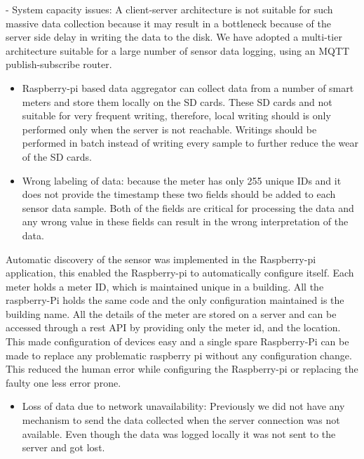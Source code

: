 - System capacity issues: A client-server architecture is not suitable for such massive data collection because it may result in a bottleneck because of the server side delay in writing the data to the disk. We have adopted a multi-tier architecture suitable for a large number of sensor data logging, using an MQTT publish-subscribe router.

\begin{itemize}
 \item Raspberry-pi based data aggregator can collect data from a number of smart meters and store them locally on the SD cards. These SD cards and not suitable for very frequent writing, therefore, local writing should is only performed only when the server is not reachable. Writings should be performed in batch instead of writing every sample to further reduce the wear of the SD cards.
\end{itemize}

\begin{itemize}
 \item Wrong labeling of data: because the meter has only 255 unique IDs and it does not provide the timestamp these two fields should be added to each sensor data sample. Both of the fields are critical for processing the data and any wrong value in these fields can result in the wrong interpretation of the data.
\end{itemize}

Automatic discovery of the sensor was implemented in the Raspberry-pi application, this enabled the Raspberry-pi to automatically configure itself. Each meter holds a meter ID, which is maintained unique in a building.  All the raspberry-Pi holds the same code and the only configuration maintained is the building name. All the details of the meter are stored on a server and can be accessed through a rest API by providing only the meter id, and the location. This made configuration of devices easy and a single spare Raspberry-Pi can be made to replace any problematic raspberry pi without any configuration change. This reduced the human error while configuring the Raspberry-pi or replacing the faulty one less error prone.

\begin{itemize}
 \item Loss of data due to network unavailability: Previously we did not have any mechanism to send the data collected when the server connection was not available.  Even though the data was logged locally it was not sent to the server and got lost.
\end{itemize}

